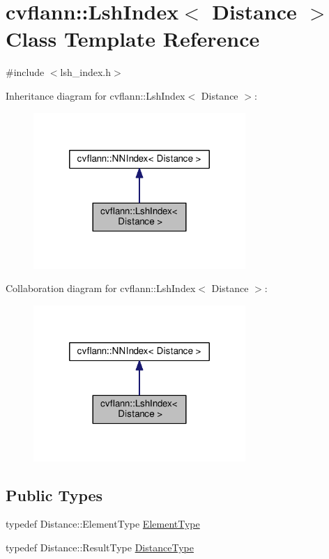 \hypertarget{classcvflann_1_1LshIndex}{\section{cvflann\-:\-:Lsh\-Index$<$ Distance $>$ Class Template Reference}
\label{classcvflann_1_1LshIndex}
}


{\ttfamily \#include $<$lsh\-\_\-index.\-h$>$}



Inheritance diagram for cvflann\-:\-:Lsh\-Index$<$ Distance $>$\-:\nopagebreak
\begin{figure}[H]
\begin{center}
\leavevmode
\includegraphics[width=228pt]{classcvflann_1_1LshIndex__inherit__graph}
\end{center}
\end{figure}


Collaboration diagram for cvflann\-:\-:Lsh\-Index$<$ Distance $>$\-:\nopagebreak
\begin{figure}[H]
\begin{center}
\leavevmode
\includegraphics[width=228pt]{classcvflann_1_1LshIndex__coll__graph}
\end{center}
\end{figure}
\subsection*{Public Types}
\begin{DoxyCompactItemize}
\item 
typedef Distance\-::\-Element\-Type \hyperlink{classcvflann_1_1LshIndex_a2f042ae6416a2a78d1d9a7f622d1e284}{Element\-Type}
\item 
typedef Distance\-::\-Result\-Type \hyperlink{classcvflann_1_1LshIndex_aed0c5e217eff759f37ef2b91a9ddaae6}{Distance\-Type}
\end{DoxyCompactItemize}
